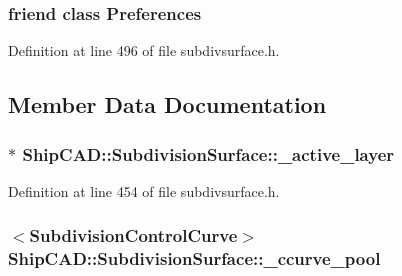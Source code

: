 \subsubsection[{\texorpdfstring{Preferences}{Preferences}}]{\setlength{\rightskip}{0pt plus 5cm}friend class {\bf Preferences}\hspace{0.3cm}{\ttfamily [friend]}}\hypertarget{classShipCAD_1_1SubdivisionSurface_aac5731b90dac5ab98f6153447ce63674}{}\label{classShipCAD_1_1SubdivisionSurface_aac5731b90dac5ab98f6153447ce63674}


Definition at line 496 of file subdivsurface.\+h.



\subsection{Member Data Documentation}
\subsubsection[{\texorpdfstring{\+\_\+active\+\_\+layer}{_active_layer}}]{$\ast$ Ship\+C\+A\+D\+::\+Subdivision\+Surface\+::\+\_\+active\+\_\+layer\hspace{0.3cm}{\ttfamily [protected]}}\hypertarget{classShipCAD_1_1SubdivisionSurface_aef766e0b62189247c0f3214c56800040}{}\label{classShipCAD_1_1SubdivisionSurface_aef766e0b62189247c0f3214c56800040}


Definition at line 454 of file subdivsurface.\+h.

\subsubsection[{\texorpdfstring{\+\_\+ccurve\+\_\+pool}{_ccurve_pool}}]{$<${\bf Subdivision\+Control\+Curve}$>$ Ship\+C\+A\+D\+::\+Subdivision\+Surface\+::\+\_\+ccurve\+\_\+pool\hspace{0.3cm}{\ttfamily [protected]}}\hypertarget{classShipCAD_1_1SubdivisionSurface_a5aea3b12c1d7f9903e2503f3b3cb4392}{}\label{classShipCAD_1_1SubdivisionSurface_a5aea3b12c1d7f9903e2503f3b3cb4392}


